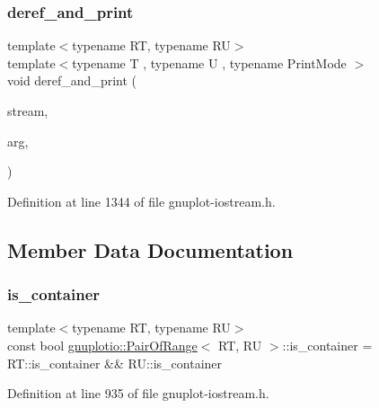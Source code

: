 \subsubsection{\texorpdfstring{deref\+\_\+and\+\_\+print}{deref\_and\_print}}
{\footnotesize\ttfamily template$<$typename RT, typename RU$>$ \\
template$<$typename T , typename U , typename Print\+Mode $>$ \\
void deref\+\_\+and\+\_\+print (\begin{DoxyParamCaption}\item[{std\+::ostream \&}]{stream,  }\item[{const \hyperlink{classgnuplotio_1_1_pair_of_range}{Pair\+Of\+Range}$<$ T, U $>$ \&}]{arg,  }\item[{Print\+Mode}]{ }\end{DoxyParamCaption})\hspace{0.3cm}{\ttfamily [friend]}}



Definition at line 1344 of file gnuplot-\/iostream.\+h.



\subsection{Member Data Documentation}
\mbox{\label{classgnuplotio_1_1_pair_of_range_ab49c6567f0fa6a82fa2a6245fd964659}} 
\subsubsection{\texorpdfstring{is\+\_\+container}{is\_container}}
{\footnotesize\ttfamily template$<$typename RT, typename RU$>$ \\
const bool \hyperlink{classgnuplotio_1_1_pair_of_range}{gnuplotio\+::\+Pair\+Of\+Range}$<$ RT, RU $>$\+::is\+\_\+container = R\+T\+::is\+\_\+container \&\& R\+U\+::is\+\_\+container\hspace{0.3cm}{\ttfamily [static]}}



Definition at line 935 of file gnuplot-\/iostream.\+h.

\mbox{\label{classgnuplotio_1_1_pair_of_range_ac3c197aa24c55c214cbab37ecc17635e}} 
